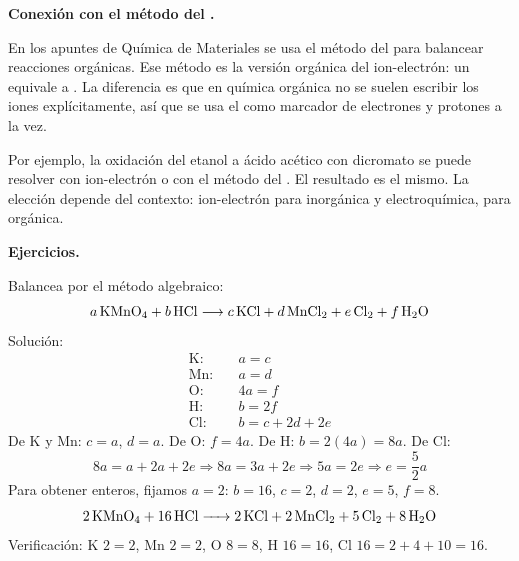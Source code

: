 \begin{notaimportante}
\textbf{Conexión con el método del \ce{[H]}.}

En los apuntes de Química de Materiales se usa el método del
\ce{[H]} para balancear reacciones orgánicas. Ese método es la
versión orgánica del ion-electrón: un \ce{[H]} equivale a
. La diferencia es que en química orgánica no se
suelen escribir los iones explícitamente, así que se usa el
\ce{[H]} como marcador de electrones y protones a la vez.

Por ejemplo, la oxidación del etanol a ácido acético con
dicromato se puede resolver con ion-electrón o con el método
del \ce{[H]}. El resultado es el mismo. La elección depende del
contexto: ion-electrón para inorgánica y electroquímica,
\ce{[H]} para orgánica.
\end{notaimportante}

\medskip
\textbf{Ejercicios.}

\begin{exercise}{}{}
Balancea por el método algebraico:
\[
a\,\ce{KMnO4} + b\,\ce{HCl} \longrightarrow c\,\ce{KCl} + d\,\ce{MnCl2} + e\,\ce{Cl2} + f\,\ce{H2O}
\]
Solución:
\begin{align*}
\text{K:} &\quad a = c \\
\text{Mn:} &\quad a = d \\
\text{O:} &\quad 4a = f \\
\text{H:} &\quad b = 2f \\
\text{Cl:} &\quad b = c + 2d + 2e
\end{align*}
De K y Mn: $c=a$, $d=a$. De O: $f=4a$. De H: $b=2(4a)=8a$. De Cl:
\[
8a = a + 2a + 2e \Rightarrow 8a = 3a + 2e \Rightarrow 5a = 2e \Rightarrow e = \frac{5}{2}a
\]
Para obtener enteros, fijamos $a=2$: $b=16$, $c=2$, $d=2$,
$e=5$, $f=8$.
\[
\ce{2KMnO4 + 16HCl -> 2KCl + 2MnCl2 + 5Cl2 + 8H2O}
\]
Verificación: K $2=2$, Mn $2=2$, O $8=8$, H $16=16$,
Cl $16 = 2+4+10 = 16$.
\end{exercise}

